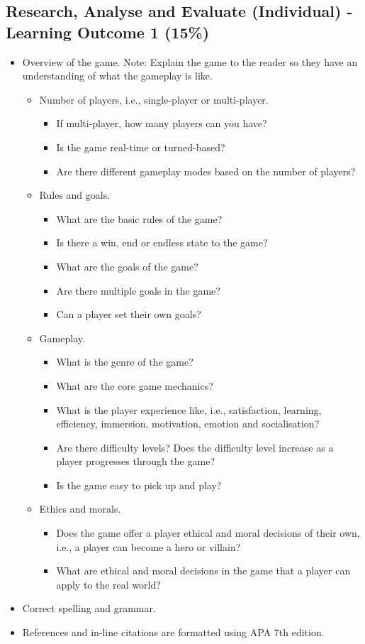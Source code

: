 \documentclass{article}
\begin{document}
\subsection{Research, Analyse and Evaluate (Individual) - Learning Outcome 1 (15\%)}
\begin{itemize}
	\item Overview of the game. Note: Explain the game to the reader so they have an understanding of what the gameplay is like.
	\begin{itemize}
		\item Number of players, i.e., single-player or multi-player.
		\begin{itemize}
			\item If multi-player, how many players can you have?
			\item Is the game real-time or turned-based?
			\item Are there different gameplay modes based on the number of players?
		\end{itemize}
		\item Rules and goals.
		\begin{itemize}
			\item What are the basic rules of the game?
			\item Is there a win, end or endless state to the game?
			\item What are the goals of the game?
			\item Are there multiple goals in the game?
			\item Can a player set their own goals?
		\end{itemize}
		\item Gameplay.
		\begin{itemize}
			\item What is the genre of the game?
			\item What are the core game mechanics?
			\item What is the player experience like, i.e., satisfaction, learning, efficiency, immersion, motivation,
			emotion and socialisation?
			\item Are there difficulty levels? Does the difficulty level increase as a player progresses through the
			game?
			\item Is the game easy to pick up and play?
		\end{itemize}
		\item Ethics and morals.
		\begin{itemize}
			\item Does the game offer a player ethical and moral decisions of their own, i.e., a player can become a
			hero or villain?
			\item What are ethical and moral decisions in the game that a player can apply to the real world?
		\end{itemize}
	\end{itemize}
	\item Correct spelling and grammar.
	\item References and in-line citations are formatted using APA 7th edition.
\end{itemize}
\end{document}
